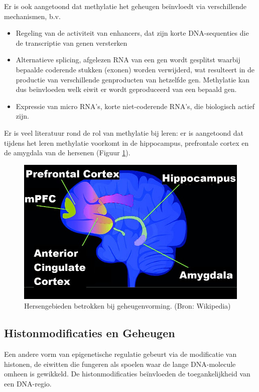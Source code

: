 \documentclass[
  11pt,
]{book}
\providecommand{\tightlist}{%
  \setlength{\itemsep}{0pt}\setlength{\parskip}{0pt}}
\begin{document}
Er is ook aangetoond dat methylatie het geheugen beïnvloedt via verschillende mechanismen, b.v.

\begin{itemize}
\tightlist
\item
  Regeling van de activiteit van enhancers, dat zijn korte DNA-sequenties die de transcriptie van genen versterken
\item
  Alternatieve splicing, afgelezen RNA van een gen wordt gesplitst waarbij bepaalde coderende stukken (exonen) worden verwijderd, wat resulteert in de productie van verschillende genproducten van hetzelfde gen. Methylatie kan dus beïnvloeden welk eiwit er wordt geproduceerd van een bepaald gen.
\item
  Expressie van micro RNA's, korte niet-coderende RNA's, die biologisch actief zijn.
\end{itemize}

Er is veel literatuur rond de rol van methylatie bij leren: er is aangetoond dat tijdens het leren methylatie voorkomt in de hippocampus, prefrontale cortex en de amygdala van de hersenen (Figuur \ref{fig:brainRegionsLearning}).

\begin{figure}

{\centering \includegraphics[width=0.5\linewidth]{./figs/Brain_regions_in_memory_formation} 

}

\caption{Hersengebieden betrokken bij geheugenvorming. (Bron: Wikipedia)}\label{fig:brainRegionsLearning}
\end{figure}

\hypertarget{histonmodificaties-en-geheugen}{%
\subsection{Histonmodificaties en Geheugen}\label{histonmodificaties-en-geheugen}}

Een andere vorm van epigenetische regulatie gebeurt via de modificatie van histonen, de eiwitten die fungeren als spoelen waar de lange DNA-molecule omheen is gewikkeld. De histonmodificaties beïnvloeden de toegankelijkheid van een DNA-regio.
\end{document}
